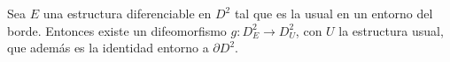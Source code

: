 \begin{hecho}
	Sea $E$ una estructura diferenciable en $D^2$ tal que es la usual en un entorno del borde. Entonces existe un difeomorfismo $g:D^2_E \rightarrow D^2_U$, con $U$ la estructura usual, que además es la identidad entorno a $\partial D^2$.
\end{hecho}



\endinput

